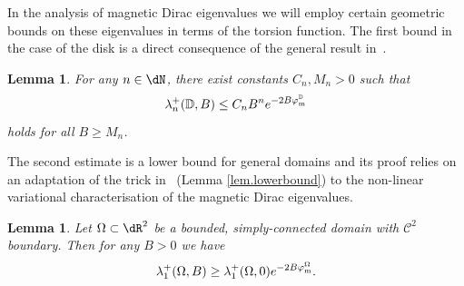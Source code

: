 \documentclass[11pt,a4paper]{amsart}
\newcommand\Omg{\Omega}
\def\lm{\lambda}
\numberwithin{figure}{section}
\numberwithin{equation}{section}
\theoremstyle{plain}%
\theoremstyle{remark}
\theoremstyle{plain}
\newtheorem{lemma}[theorem]{Lemma}
\newcommand{\D}{\mathbb D}
\begin{document}
In the analysis of magnetic Dirac eigenvalues we will employ certain geometric bounds on these eigenvalues in terms of the torsion function.
The first bound in the case of the disk is a direct consequence of the general result in~\cite[Theorem 1.11]{BLRS23}.

\begin{lemma}\label{lem.upper.dirac}
	For any $n\in\dN$, there exist constants $C_n, M_n > 0$ such that
	\[
		\lm_n^+(\D,B) \le C_n B^n e^{-2B \varphi^{\mathbb D}_{\rm m}}
	\] 
	holds for all $B \ge M_n$.
\end{lemma}
The second estimate is a lower bound for general domains and its proof relies on an adaptation of the trick in~\cite{HelfferSundqvist} (Lemma \ref{lem.lowerbound}) to the non-linear variational characterisation of the magnetic Dirac eigenvalues.
\begin{lemma}\label{lem.lower.dirac}
	Let $\Omg\subset\dR^2$ be a bounded, simply-connected domain with $\mathscr C^2$ boundary. Then for any $B > 0$ we have
	\[
		\lm_1^+(\Omg,B) \ge \lm_1^+(\Omg,0) e^{-2B\varphi^\Omg_{\rm m}}.
	\]
\end{lemma}
\end{document}
